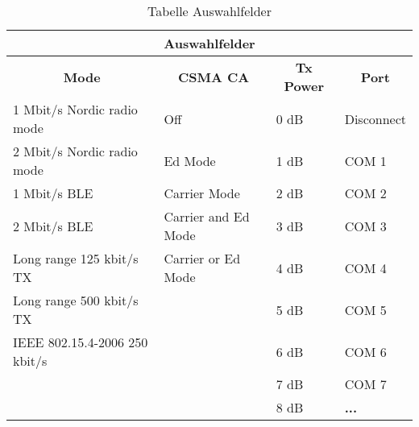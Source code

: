
\begin{table}
\centering
\begin{tabular}{|l|l|l|l|} 
\hline
\multicolumn{4}{|c|}{\textbf{Auswahlfelder} } \\ 
\hline
\multicolumn{1}{|c|}{\textbf{Mode} } & \multicolumn{1}{c|}{\textbf{CSMA CA} } & \multicolumn{1}{c|}{\textbf{Tx Power} } & \multicolumn{1}{c|}{\textbf{Port} } \\ 
\hline
1 Mbit/s Nordic radio mode & Off & 0 dB & Disconnect \\ 
\hline
2 Mbit/s Nordic radio mode & Ed Mode & 1 dB & COM 1 \\ 
\hline
1 Mbit/s BLE & Carrier Mode & 2 dB & COM 2 \\ 
\hline
2 Mbit/s BLE & Carrier and Ed Mode & 3 dB & COM 3 \\ 
\hline
Long range 125 kbit/s TX & Carrier or Ed Mode & 4 dB & COM 4 \\ 
\hline
Long range 500 kbit/s TX &  & 5 dB & COM 5 \\ 
\cline{1-1}\cline{3-4}
IEEE 802.15.4-2006 250 kbit/s &  & 6 dB & COM 6 \\ 
\cline{1-1}\cline{3-4}
\multicolumn{1}{l}{} &  & 7 dB & COM 7 \\ 
\cline{3-4}
\multicolumn{1}{l}{} &  & 8 dB & \textbf{...}  \\
\cline{3-4}
\end{tabular}
\caption{Tabelle Auswahlfelder}
\label{table:TabelleAuswahlfelder}
\end{table}

